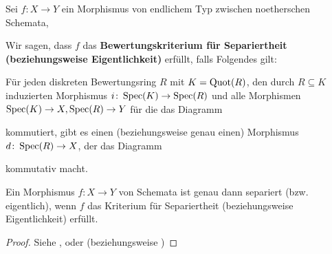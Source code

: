 \begin{bem}
	\label{bem:10.6}
	Sei $f\colon X \to Y$ ein Morphismus von endlichem Typ zwischen noetherschen Schemata,

	Wir sagen, dass $f$ das \textbf{Bewertungskriterium für Separiertheit (beziehungsweise Eigentlichkeit)} erfüllt, falls Folgendes gilt:
		
	Für jeden diskreten Bewertungsring $R$ mit $K = \operatorname{Quot}(R)$, den durch $R \subseteq K$ induzierten Morphismus $i \colon \operatorname{Spec}(K) \to \operatorname{Spec}(R)$ und alle Morphismen $\operatorname{Spec}(K) \to X, \operatorname{Spec}(R) \to Y$ für die das Diagramm
	\begin{center}
	\end{center}
	kommutiert, gibt es einen (beziehungsweise genau einen) Morphismus $d \colon \operatorname{Spec}(R) \to X$, der das Diagramm
	\begin{center}
	\end{center}
	kommutativ macht.
\end{bem}

\begin{thm}
	\label{thm:10.7}
	Ein Morphismus $f \colon X \to Y$ von Schemata ist genau dann separiert (bzw. eigentlich), wenn $f$ das Kriterium für Separiertheit (beziehungsweise Eigentlichkeit) erfüllt.
	\begin{proof}
		Siehe \cite[7.2.3]{grothendieck1971elements}, oder \cite[Theorem 15.9]{goertz2010algebraic} (beziehungsweise \cite[Theorem 7.3.8]{grothendieck1971elements})
	\end{proof}
\end{thm}

